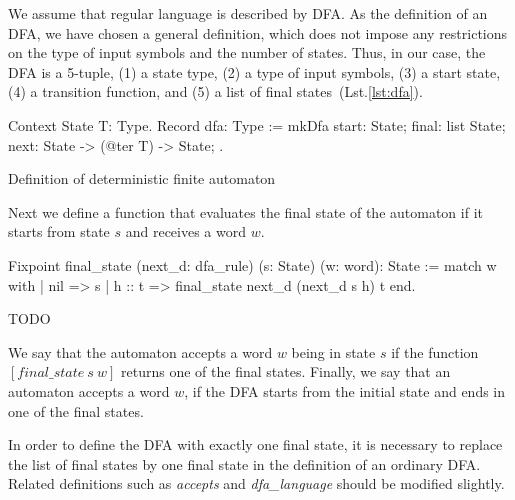 We assume that regular language is described by DFA. As the definition of an DFA, we have chosen a general definition, which does not impose any restrictions on the type of input symbols and the number of states. Thus, in our case, the DFA is a 5-tuple, (1) a state type, (2) a type of input symbols, (3) a start state, (4) a transition function, and (5) a list of final states~(Lst.\ref{lst:dfa}).

\begin{listing}[h]
    \begin{pyglist}[language=coq, numbers=none, numbersep=5pt]
  Context {State T: Type}.
  Record dfa: Type :=
    mkDfa {
      start: State;
      final: list State;
      next: State -> (@ter T) -> State;
    }.
    \end{pyglist}
    \caption{Definition of deterministic finite automaton}
    \label{lst:dfa}
\end{listing}

Next we define a function that evaluates the final state of the automaton if it starts from state $s$ and receives a word $w$. 

\begin{listing}[h]
    \begin{pyglist}[language=coq, numbers=none, numbersep=5pt]
  Fixpoint final_state 
             (next_d: dfa_rule) 
             (s: State) 
             (w: word): State :=
    match w with
    | nil => s 
    | h :: t => final_state next_d 
                            (next_d s h)
                            t 
    end.
    \end{pyglist}
    \caption{TODO}
    \label{lst:verbments1}
\end{listing}

We say that the automaton accepts a word $w$ being in state $s$ if the function $[\textit{final\_state} \ s \ w]$ returns one of the final states.
Finally, we say that an automaton accepts a word $w$, if the DFA starts from the initial state and ends in one of the final states.



In order to define the DFA with exactly one final state, it is necessary to replace the list of final states by one final state in the definition of an ordinary DFA. 
Related definitions such as \textit{accepts} and \textit{dfa\_language} should be modified slightly.

